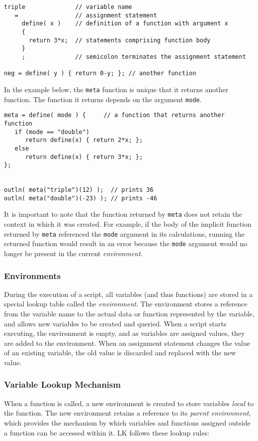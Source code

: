 \documentclass{article}
\begin{document}
\begin{verbatim}
triple              // variable name
   =                // assignment statement
     define( x )    // definition of a function with argument x
     {              
       return 3*x;  // statements comprising function body
     }        
     ;              // semicolon terminates the assignment statement
     
neg = define( y ) { return 0-y; }; // another function
\end{verbatim}

In the example below, the \texttt{meta} function is unique that it returns another function.  The function it returns depends on the argument \texttt{mode}.

\begin{verbatim}
meta = define( mode ) {     // a function that returns another function
   if (mode == "double")
      return define(x) { return 2*x; };
   else
      return define(x) { return 3*x; };
};


outln( meta("triple")(12) );  // prints 36
outln( meta("double")(-23) ); // prints -46

\end{verbatim}

It is important to note that the function returned by \texttt{meta} does not retain the context in which it was created.  For example, if the body of the implicit function returned by \texttt{meta} referenced the \texttt{mode} argument in its calculations, running the returned function would result in an error because the \texttt{mode} argument would no longer be present in the current \emph{environment}.

\subsubsection{Environments}

During the execution of a script, all variables (and thus functions) are stored in a special lookup table called the \emph{environment}.  The environment stores a reference from the variable name to the actual data or function represented by the variable, and allows new variables to be created and queried.  When a script starts executing, the environment is empty, and as variables are assigned values, they are added to the environment.  When an assignment statement changes the value of an existing variable, the old value is discarded and replaced with the new value.

\subsubsection{Variable Lookup Mechanism}
When a function is called, a new environment is created to store variables \emph{local} to the function.  The new environment retains a reference to its \emph{parent environment}, which provides the mechanism by which variables and functions assigned outside a function can be accessed within it.  LK follows these lookup rules:
\end{document}
